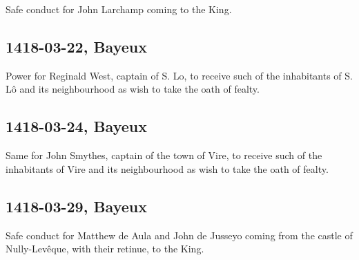 \documentclass[a4paper,12pt,twoside]{book}
\begin{document}
                
                     Safe conduct for John Larchamp coming to the King.
                  
                
                \subsection{1418-03-22, Bayeux}
                
                
                     Power for Reginald West, captain of S. Lo, to receive such of the inhabitants of S. Lô and its neighbourhood as wish to take the oath of fealty.
                  
                
                \subsection{1418-03-24, Bayeux}
                
                
                     Same for John Smythes, captain of the town of Vire, to receive such of the inhabitants of Vire and its neighbourhood as wish to take the oath of fealty.
                  
                
                \subsection{1418-03-29, Bayeux}
                
                
                     Safe conduct for Matthew de Aula and John de Jusseyo coming from the castle of Nully-Levêque, with their retinue, to the King.
                  
                \newpage
              
            
            
            \printindex[indiv]
            
\end{document}
